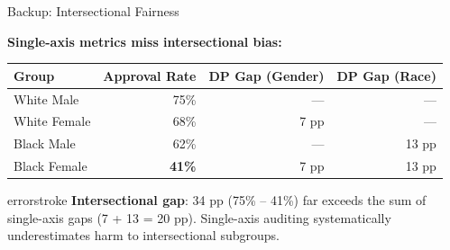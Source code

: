 \documentclass[aspectratio=169, 12pt]{beamer}
\begin{document}
\appendix

\begin{frame}{Backup: Intersectional Fairness}

\footnotesize
\textbf{Single-axis metrics miss intersectional bias:}

\vspace{0.1cm}
\renewcommand{\arraystretch}{1.15}
\begin{tabular}{@{}lrrr@{}}
  \toprule
  \textbf{Group} & \textbf{Approval Rate} & \textbf{DP Gap (Gender)} & \textbf{DP Gap (Race)} \\
  \midrule
  White Male     & 75\% & --- & --- \\
  White Female   & 68\% & 7 pp & --- \\
  Black Male     & 62\% & --- & 13 pp \\
  Black Female   & \textcolor{errorstroke}{\textbf{41\%}} & 7 pp & 13 pp \\
  \bottomrule
\end{tabular}

\vspace{0.1cm}
\begin{mlsyscard}{errorstroke}
{\footnotesize \textbf{Intersectional gap}: 34 pp (75\% -- 41\%) far exceeds the sum of single-axis gaps (7 + 13 = 20 pp). Single-axis auditing systematically underestimates harm to intersectional subgroups.}
\end{mlsyscard}

\end{frame}
\end{document}
